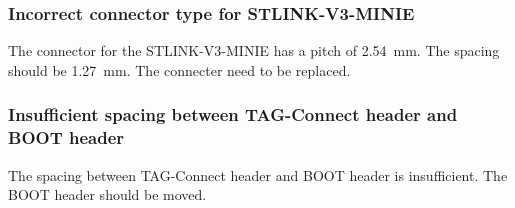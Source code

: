 \subsubsection{Incorrect connector type for STLINK-V3-MINIE}
The connector for the STLINK-V3-MINIE has a pitch of \qty{2.54}{\milli\meter}. The spacing should be \qty{1.27}{\milli\meter}. The connecter need to be replaced. 

\subsubsection{Insufficient spacing between TAG-Connect header and BOOT header}
The spacing between TAG-Connect header and BOOT header is insufficient. The BOOT header should be moved. 

